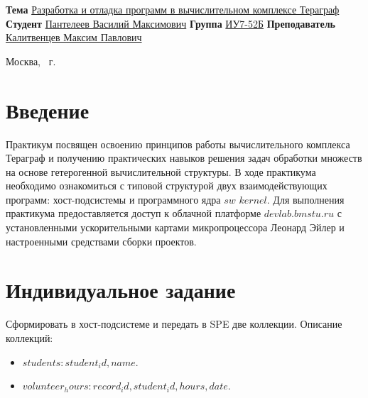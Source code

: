 \documentclass{article}
\begin{document}
\begin{titlepage}
	\noindent\begin{minipage}{1.0\textwidth}\centering
		\Large\textbf{\newline\newline\newline\newline}	
		\end{minipage}
	
	\noindent\textbf{Тема} \underline{Разработка и отладка программ в вычислительном комплексе Тераграф}
\newline\newline
	\textbf{Студент} \underline{Пантелеев Василий Максимович}\newline\newline
	\textbf{Группа} \underline{ИУ7-52Б}\newline\newline
	\textbf{Преподаватель} \underline{Калитвенцев Максим Павлович}
	
	\begin{center}
		\vfill
		Москва, \the\year ~г.
	\end{center}
	\restoregeometry
	\clearpage
\end{titlepage}

\section{Введение}

Практикум посвящен освоению принципов работы вычислительного комплекса Тераграф и получению практических навыков 
решения задач обработки множеств на основе гетерогенной вычислительной структуры. В ходе практикума необходимо 
ознакомиться с типовой структурой двух взаимодействующих программ: хост-подсистемы и программного ядра $sw$ $kernel$.
Для выполнения практикума предоставляется доступ к облачной платформе $devlab.bmstu.ru$ с установленными 
ускорительными картами микропроцессора Леонард Эйлер и настроенными средствами сборки проектов.

\clearpage\section{Индивидуальное задание}

Сформировать в хост-подсистеме и передать в SPE две коллекции. Описание коллекций:

\begin{itemize}
	\item[---] $students: student_id, name$.
	\item[---] $volunteer_hours: record_id, student_id, hours, date$.
\end{itemize}
\end{document}
